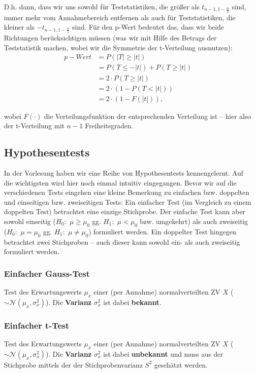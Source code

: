 \documentclass[a4paper]{article}
\begin{document}
\noindent D.h. dann, dass wir uns sowohl für Teststatistiken, die größer als $t_{n-1,1-\frac{\alpha}{2}}$ sind, immer mehr vom Annahmebereich entfernen als auch für Teststatistiken, die kleiner als $-t_{n-1,1-\frac{\alpha}{2}}$ sind. Für den p-Wert bedeutet das, dass wir beide Richtungen berücksichtigen müssen (was wir mit Hilfe des Betrags der Teststatistik machen, wobei wir die Symmetrie der t-Verteilung ausnutzen):
\begin{align*} 
p-Wert &= P(|T| \geq |t|)  \\
	&=	P(T \leq -|t|) + P(T \geq |t|)			\\
	&=	2 \cdot P(T \geq |t|)			\\
	&=	2 \cdot (1-P(T < |t|))			\\
	&=	2 \cdot (1-F(|t|)),		
\end{align*} 

\noindent wobei $F(\cdot)$ die Verteilungsfunktion der entsprechenden Verteilung ist -- hier also der t-Verteilung mit $n-1$ Freiheitsgraden.
\subsection{Hypothesentests}\label{sec:HypTests}

In der Vorlesung haben wir eine Reihe von Hypothesentests kennengelernt. Auf die wichtigsten wird hier noch einmal intuitiv eingegangen. Bevor wir auf die verschiedenen Tests eingehen eine kleine Bemerkung zu einfachen bzw. doppelten und einseitigen bzw. zweiseitigen Tests:
Ein einfacher Test (im Vergleich zu einem doppelten Test) betrachtet eine einzige Stichprobe. Der einfache Test kann aber sowohl einseitig ($H_0:$ $\mu \geq \mu_0$ gg. $H_1:$ $\mu < \mu_0$ bzw. umgekehrt) als auch zweiseitig ($H_0:$ $\mu = \mu_0$ gg. $H_1:$ $\mu \neq \mu_0$) formuliert werden. Ein doppelter Test hingegen betrachtet zwei Stichproben -- auch dieser kann sowohl ein- als auch zweiseitig formuliert werden.

\subsubsection{Einfacher Gauss-Test}\label{sec:Gausstest1}
Test des Erwartungswerts $\mu_x$ einer (per Annahme) normalverteilten ZV $X$ ($\sim \mathcal{N}(\mu_x, \sigma_x^2)$). Die \textbf{Varianz} $\sigma_x^2$ ist dabei \textbf{bekannt}. 

\subsubsection{Einfacher t-Test}\label{sec:tTest1}
Test des Erwartungswerts $\mu_x$ einer (per Annahme) normalverteilten ZV $X$ ($\sim \mathcal{N}(\mu_x, \sigma_x^2)$). Die \textbf{Varianz} $\sigma_x^2$ ist dabei \textbf{unbekannt} und muss aus der Stichprobe mittels der der Stichprobenvarianz $S^2$ geschätzt werden. 
\end{document}
